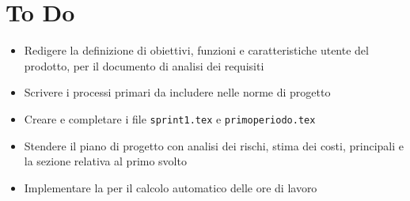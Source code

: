 \documentclass[a4paper, 12pt]{article}
\begin{document}
\section{To Do}
\begin{itemize}
    \item Redigere la definizione di obiettivi, funzioni e caratteristiche utente del prodotto, per il documento di analisi dei requisiti
    \item Scrivere i processi primari da includere nelle norme di progetto
    \item Creare e completare i file \texttt{sprint1.tex} e \texttt{primoperiodo.tex}
    \item Stendere il piano di progetto con analisi dei rischi, stima dei costi,  principali e la sezione relativa al primo  svolto
    \item Implementare la  per il calcolo automatico delle ore di lavoro
\end{itemize}
\end{document}
